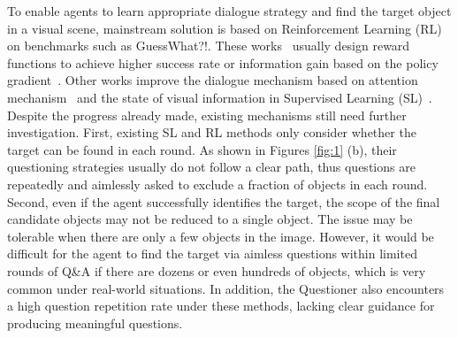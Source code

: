 

To enable agents to learn appropriate dialogue strategy and find the target object in a visual scene, mainstream solution is based on Reinforcement Learning (RL)~\cite{le2022multimodal} on benchmarks such as GuessWhat?!. 
These works~\cite{strub2017end,shukla2019should,zhang2018goal,abbasnejad2018active,abbasnejad2019s,zhao2018improving} usually design reward functions to achieve higher success rate or information gain based on the policy gradient~\cite{1999Policy}.
Other works improve the dialogue mechanism based on attention mechanism~\cite{anderson2018bottom} and the state of visual information in Supervised Learning (SL)~\cite{pang2020guessing, pang2020visual,tu2021learning}.
Despite the progress already made, existing mechanisms still need further investigation.
First, existing SL and RL methods only consider whether the target can be found in each round.
As shown in Figures \ref{fig:1} (b), their questioning strategies usually do not follow a clear path, thus questions are repeatedly and aimlessly asked to exclude a fraction of objects in each round. 
Second, even if the agent successfully identifies the target, the scope of the final candidate objects may not be reduced to a single object. 
The issue may be tolerable when there are only a few objects in the image. However, it would be difficult for the agent to find the target via aimless questions within limited rounds of Q\&A if there are dozens or even hundreds of objects, which is very common under real-world situations. In addition, the Questioner also encounters a high 
question repetition rate under these methods, lacking clear guidance for producing meaningful questions. 

